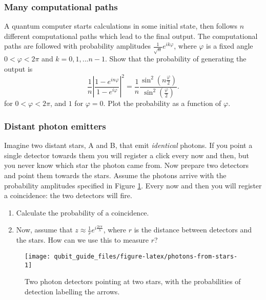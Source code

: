 \documentclass[fleqn]{article}
\providecommand{\tightlist}{%
  \setlength{\itemsep}{0pt}\setlength{\parskip}{0pt}}
\renewcommand{\footnote}[1]{\en{#1}}
\begin{document}
\hypertarget{many-computational-paths}{%
\subsubsection{Many computational paths}\label{many-computational-paths}}

A quantum computer starts calculations in some initial state, then follows \(n\) different computational paths which lead to the final output.
The computational paths are followed with probability amplitudes \(\frac{1}{\sqrt n}e^{i k \varphi}\), where \(\varphi\) is a fixed angle \(0< \varphi <2\pi\) and \(k=0,1,...n-1\).
Show that the probability of generating the output is\footnote{\(1+z+z^2+\ldots + z^n= \frac{1-z^{n+1}}{1-z}\)}
\[
  \frac{1}{n}\left\vert
    \frac{1-e^{i n\varphi}}{1-e^{i\varphi}}
  \right\vert^2
  = \frac{1}{n} \frac{\sin^2 (n\frac{\varphi}{2})}{\sin^2 (\frac{\varphi}{2})}.
\]
for \(0<\varphi<2\pi\), and \(1\) for \(\varphi=0\).
Plot the probability as a function of \(\varphi\).

\hypertarget{distant-photon-emitters}{%
\subsubsection{Distant photon emitters}\label{distant-photon-emitters}}

Imagine two distant stars, A and B, that emit \emph{identical} photons.
If you point a single detector towards them you will register a click every now and then, but you never know which star the photon came from.
Now prepare two detectors and point them towards the stars.
Assume the photons arrive with the probability amplitudes specified in Figure \ref{fig:photons-from-stars}.
Every now and then you will register a coincidence: the two detectors will fire.

\begin{enumerate}
\def\labelenumi{\alph{enumi}.}
\tightlist
\item
  Calculate the probability of a coincidence.
\item
  Now, assume that \(z\approx \frac{1}{r}e^{i\frac{2r\pi}{\lambda}}\), where \(r\) is the distance between detectors and the stars. How can we use this to measure \(r\)?
\end{enumerate}

\begin{figure}[H]

{\centering \texttt{[image: qubit\_guide\_files/figure-latex/photons-from-stars-1]} 

}

\caption{Two photon detectors pointing at two stars, with the probabilities of detection labelling the arrows.}\label{fig:photons-from-stars}
\end{figure}
\end{document}
